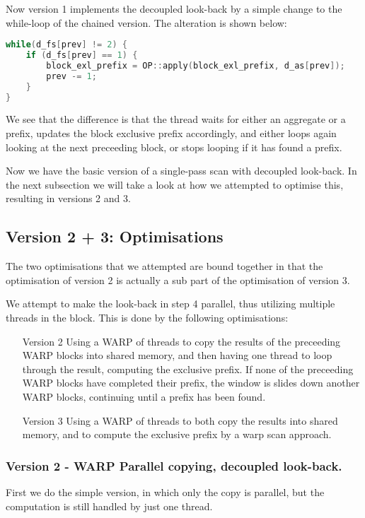 Now version 1 implements the decoupled look-back by a simple change to the while-loop of the chained version.
The alteration is shown below:
\begin{lstlisting}[language=c++]
while(d_fs[prev] != 2) {
    if (d_fs[prev] == 1) {
        block_exl_prefix = OP::apply(block_exl_prefix, d_as[prev]);
        prev -= 1;
    }
}
\end{lstlisting}
We see that the difference is that the thread waits for either an aggregate or a prefix, updates the block exclusive prefix accordingly, and either loops again looking at the next preceeding block, or stops looping if it has found a prefix.

Now we have the basic version of a single-pass scan with decoupled look-back.
In the next subsection we will take a look at how we attempted to optimise this, resulting in versions 2 and 3.

\subsection{Version 2 + 3: Optimisations}
The two optimisations that we attempted are bound together in that the optimisation of version 2 is actually a sub part of the optimisation of version 3.

We attempt to make the look-back in step 4 parallel, thus utilizing multiple threads in the block.
This is done by the following optimisations:
\begin{itemize}
  \item [Version 2] Using a WARP of threads to copy the results of the preceeding WARP blocks into shared memory, and then having one thread to loop through the result, computing the exclusive prefix. If none of the preceeding WARP blocks have completed their prefix, the window is slides down another WARP blocks, continuing until a prefix has been found.
  \item [Version 3] Using a WARP of threads to both copy the results into shared memory, and to compute the exclusive prefix by a warp scan approach.
\end{itemize}

\subsubsection{Version 2 - WARP Parallel copying, decoupled look-back.}
First we do the simple version, in which only the copy is parallel, but the computation is still handled by just one thread.

